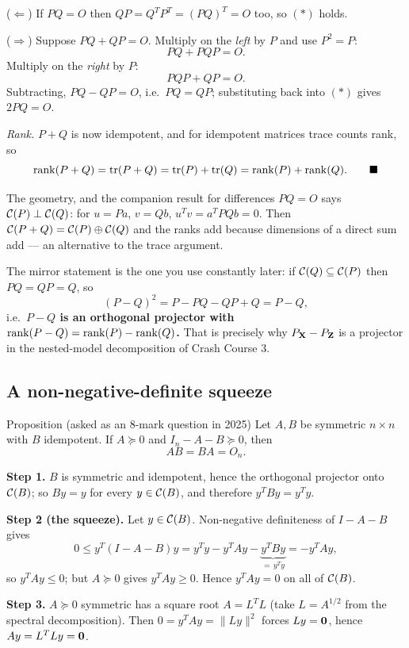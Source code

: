 \documentclass[11pt]{article}
\begin{document}
($\Leftarrow$) If $PQ=O$ then $QP=Q^TP^T=(PQ)^T=O$ too, so $(\ast)$ holds.

($\Rightarrow$) Suppose $PQ+QP=O$. Multiply on the \emph{left} by $P$ and use $P^2=P$:
\[
  PQ+PQP=O. \tag{i}
\]
Multiply on the \emph{right} by $P$:
\[
  PQP+QP=O. \tag{ii}
\]
Subtracting, $PQ-QP=O$, i.e.\ $PQ=QP$; substituting back into $(\ast)$ gives $2PQ=O$.

\emph{Rank.} $P+Q$ is now idempotent, and for idempotent matrices trace counts rank, so
\[
  \operatorname{rank}(P+Q)=\operatorname{tr}(P+Q)=\operatorname{tr}(P)+\operatorname{tr}(Q)=\operatorname{rank}(P)+\operatorname{rank}(Q). \qquad\blacksquare
\]

\begin{idea}{The geometry, and the companion result for differences}
$PQ=O$ says $\mathcal{C}(P)\perp\mathcal{C}(Q)$: for $u=Pa$, $v=Qb$, $u^Tv=a^TPQb=0$. Then
$\mathcal{C}(P+Q)=\mathcal{C}(P)\oplus\mathcal{C}(Q)$ and the ranks add because dimensions of a direct sum add ---
an alternative to the trace argument.

The mirror statement is the one you use constantly later: if $\mathcal{C}(Q)\subseteq\mathcal{C}(P)$ then
$PQ=QP=Q$, so
\[
  (P-Q)^2=P-PQ-QP+Q=P-Q,
\]
i.e.\ \textbf{$P-Q$ is an orthogonal projector with $\operatorname{rank}(P-Q)=\operatorname{rank}(P)-\operatorname{rank}(Q)$.} That is
precisely why $P_{\mathbf{X}}-P_{\mathbf{Z}}$ is a projector in the nested-model decomposition of Crash
Course 3.
\end{idea}

\subsection{A non-negative-definite squeeze}

\begin{idea}{Proposition (asked as an 8-mark question in 2025)}
Let $A,B$ be symmetric $n\times n$ with $B$ idempotent. If $A\succeq0$ and
$I_n-A-B\succeq0$, then
\[
  AB=BA=O_n .
\]
\end{idea}

\prf \textbf{Step 1.} $B$ is symmetric and idempotent, hence the orthogonal projector onto
$\mathcal{C}(B)$; so $By=y$ for every $y\in\mathcal{C}(B)$, and therefore $y^TBy=y^Ty$.

\textbf{Step 2 (the squeeze).} Let $y\in\mathcal{C}(B)$. Non-negative definiteness of $I-A-B$ gives
\[
  0\le y^T(I-A-B)y=y^Ty-y^TAy-\underbrace{y^TBy}_{=\,y^Ty}=-y^TAy,
\]
so $y^TAy\le0$; but $A\succeq0$ gives $y^TAy\ge0$. Hence $y^TAy=0$ on all of $\mathcal{C}(B)$.

\textbf{Step 3.} $A\succeq0$ symmetric has a square root $A=L^TL$ (take $L=A^{1/2}$ from the
spectral decomposition). Then $0=y^TAy=\|Ly\|^2$ forces $Ly=\mathbf{0}$, hence $Ay=L^TLy=\mathbf{0}$.
\end{document}
